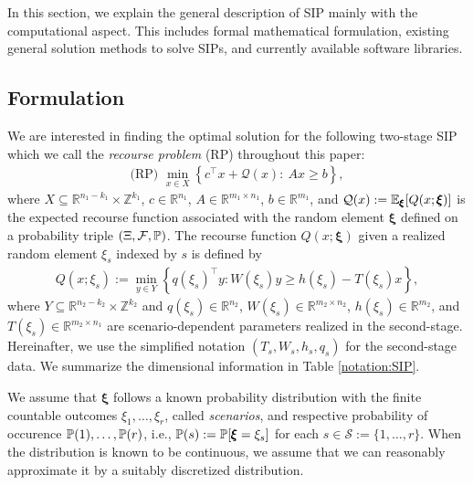 In this section, we explain the general description of SIP mainly with the computational aspect. This includes formal mathematical formulation, existing general solution methods to solve SIPs, and currently available software libraries.
\subsection{Formulation}
We are interested in finding the optimal solution for the following two-stage SIP which we call the \textit{recourse problem} (RP) throughout this paper:
\begin{align}
\textrm{(RP) }\min_{x\in X}{\left\{c^\top x + \mathcal{Q}(x):\ Ax\ge b\right\}}, \label{eq:rp}
\end{align}
where $X\subseteq \mathbb{R}^{n_1-k_1}\times\mathbb{Z}^{k_1}$, $c\in\mathbb{R}^{n_1}$, $A\in\mathbb{R}^{m_1\times n_1}$, $b\in\mathbb{R}^{m_1}$, and $\mathcal{Q}(x):=\operatorname*{\mathbb{E}}_{\pmb{\xi}}[Q(x;\pmb{\xi})]$ is the expected recourse function associated with the random element $\pmb{\xi}$ defined on a probability triple $(\Xi, \mathcal{F},\operatorname*{\mathbb{P}})$. The recourse function $Q(x;\pmb{\xi})$ given a realized random element $\xi_s$ indexed by $s$ is defined by 
\begin{align}
Q(x;\xi_s):=\min_{y\in Y}\left\{q(\xi_s)^\top y : W(\xi_s)y\ge h(\xi_s)-T(\xi_s)x\right\}, \label{eq:rf}
\end{align}
where $Y\subseteq\mathbb{R}^{n_2-k_2}\times\mathbb{Z}^{k_2}$ and $q(\xi_s)\in\mathbb{R}^{n_2}$, $W(\xi_s)\in\mathbb{R}^{m_2\times n_2}$, $h(\xi_s)\in\mathbb{R}^{m_2}$, and $T(\xi_s)\in\mathbb{R}^{m_2\times n_1}$ are scenario-dependent parameters realized in the second-stage. Hereinafter, we use the simplified notation $(T_s,W_s,h_s,q_s)$ for the second-stage data. We summarize the dimensional information in Table \ref{notation:SIP}.

We assume that $\pmb{\xi}$ follows a known probability distribution with the finite countable outcomes $\xi_1,\ldots,\xi_r$, called \textit{scenarios}, and respective probability of occurence $\operatorname*{\mathbb{P}}(1),\ldots,\operatorname*{\mathbb{P}}(r)$, i.e., $\operatorname*{\mathbb{P}}(s):=\operatorname*{\mathbb{P}}[\pmb{\xi}=\xi_s]$ for each $s\in\mathcal{S}:=\{1,\ldots,r\}$. When the distribution is known to be continuous, we assume that we can reasonably approximate it by a suitably discretized distribution. 



